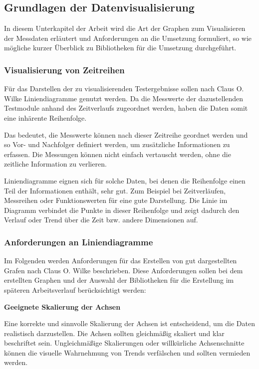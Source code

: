 \subsection{Grundlagen der Datenvisualisierung}
\label{subsec:grundlagen-der-datenvisualisierung}

In diesem Unterkapitel der Arbeit wird die Art der Graphen zum Visualisieren der Messdaten erläutert und Anforderungen an die Umsetzung formuliert,
so wie mögliche kurzer Überblick zu Bibliotheken für die Umsetzung durchgeführt.
\subsubsection{Visualisierung von Zeitreihen}

Für das Darstellen der zu visualisierenden Testergebnisse sollen nach Claus O. Wilke Liniendiagramme genutzt werden.
Da die Messwerte der dazustellenden Testmodule anhand des Zeitverlaufs zugeordnet werden, haben die Daten somit eine inhärente Reihenfolge.

Das bedeutet, die Messwerte können nach dieser Zeitreihe geordnet werden und so Vor- und Nachfolger definiert werden, um zusätzliche Informationen zu erfassen.
Die Messungen können nicht einfach vertauscht werden, ohne die zeitliche Information zu verlieren.

Liniendiagramme eignen sich für solche Daten, bei denen die Reihenfolge einen Teil der Informationen enthält, sehr gut.
Zum Beispiel bei Zeitverläufen, Messreihen oder Funktionswerten für eine gute Darstellung.
Die Linie im Diagramm verbindet die Punkte in dieser Reihenfolge und zeigt dadurch den Verlauf oder Trend über die Zeit bzw. andere Dimensionen auf. \cite{Wilke2020Datenvisualisierung}


\subsubsection{Anforderungen an Liniendiagramme}

Im Folgenden werden Anforderungen für das Erstellen von gut dargestellten Grafen nach Claus O. Wilke beschrieben.
Diese Anforderungen sollen bei dem erstellten Graphen und der Auswahl der Bibliotheken für die Erstellung im späteren Arbeitsverlauf berücksichtigt werden: \cite{Wilke2020Datenvisualisierung}

\item
\textbf{Geeignete Skalierung der Achsen}

Eine korrekte und sinnvolle Skalierung der Achsen ist entscheidend, um die Daten realistisch darzustellen.
Die Achsen sollten gleichmäßig skaliert und klar beschriftet sein.
Ungleichmäßige Skalierungen oder willkürliche Achsenschnitte können die visuelle Wahrnehmung von Trends verfälschen und sollten vermieden werden.

